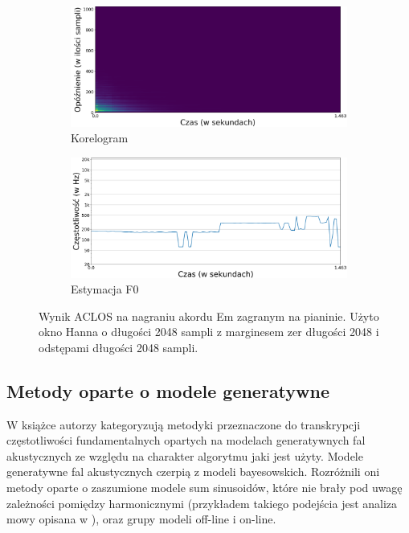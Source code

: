\documentclass[12pt,a4paper,twoside]{mwart}
\begin{document}
\begin{figure}[h]
  \begin{subfigure}{0.5\textwidth}
    \includegraphics[width=1.\linewidth]{images/Em/Aclos_corelogram_cropped.png}
    \caption{Korelogram}
  \end{subfigure}
  \begin{subfigure}{0.49\textwidth}
    \includegraphics[width=1.\linewidth]{images/Em/Aclos_estymacja_cropped.png}
    \caption{Estymacja F0}
    \label{fig:multi:aclos:estimation}
  \end{subfigure}
  \caption{Wynik ACLOS na nagraniu akordu Em zagranym na pianinie. Użyto okno Hanna o długości 2048 sampli z marginesem zer długości 2048 i odstępami długości 2048 sampli.}
  \label{fig:multi:aclos}
\end{figure}

\subsection{Metody oparte o modele generatywne}
W książce \cite[203-227]{Transcription:Anssi:SignalProcessingMethods} autorzy kategoryzują metodyki przeznaczone do transkrypcji częstotliwości fundamentalnych opartych na modelach generatywnych fal akustycznych ze względu na charakter algorytmu jaki jest użyty. Modele generatywne fal akustycznych czerpią z modeli bayesowskich. Rozróżnili oni metody oparte o zaszumione modele sum sinusoidów, które nie brały pod uwagę zależności pomiędzy harmonicznymi (przykładem takiego podejścia jest analiza mowy opisana w \cite[744-745]{Transcription:McAulay:SinusoidalRepresentationF0}), oraz grupy modeli off-line i on-line.
\end{document}
